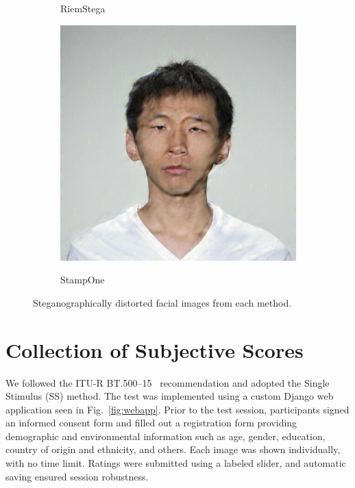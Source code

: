 \begin{figure}[ht]
\begin{subfigure}[t]{0.22\textwidth}
        \caption{RiemStega}\label{fig:steganography_c}
    \end{subfigure}
    \hfill
    \begin{subfigure}[t]{0.22\textwidth}
        \centering
        \includegraphics[width=\textwidth]{images/005_StampOne_1.4.jpg}\\
        \caption{StampOne}\label{fig:steganography_d}
    \end{subfigure}
    \caption{Steganographically distorted facial images from each method.}\label{fig:steganography}
\end{figure}

\section{Collection of Subjective Scores}

We followed the ITU-R BT.500--15~\cite{ITU-R-BT500} recommendation and adopted the Single Stimulus (SS) method. The test was implemented using a custom Django web application seen in Fig.~\ref{fig:webapp}. Prior to the test session, participants signed an informed consent form and filled out a registration form providing demographic and environmental information such as age, gender, education, country of origin and ethnicity, and others. Each image was shown individually, with no time limit. Ratings were submitted using a labeled slider, and automatic saving ensured session robustness.


